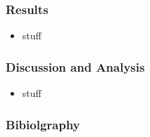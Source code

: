 \documentclass{beamer}
\begin{document}
\begin{frame}
    \frametitle{Results}
    \begin{itemize}
        \item stuff
    \end{itemize}
\end{frame}

\begin{frame}
    \frametitle{Discussion and Analysis}
    \begin{itemize}
        \item stuff
    \end{itemize}
\end{frame}

\begin{frame}
    \frametitle{Bibiolgraphy}
    
    
\end{frame}
\end{document}
